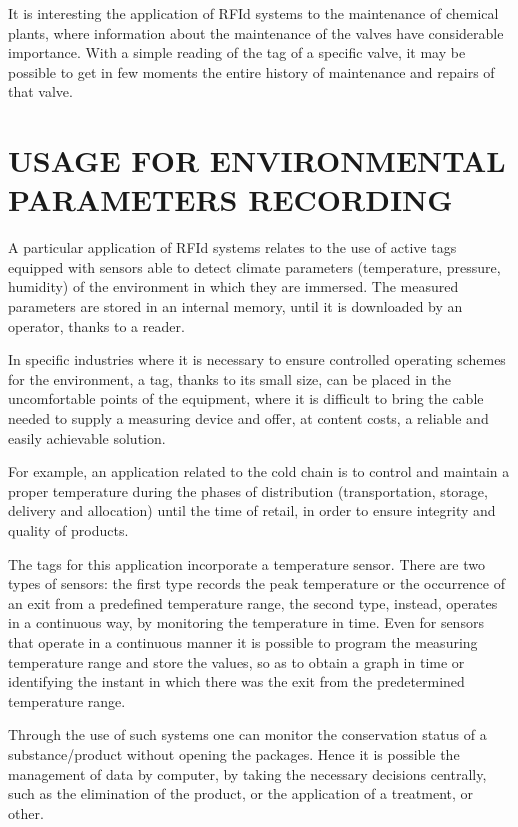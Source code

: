 \vspace*{1pc}
It is interesting the application of RFId systems to the maintenance of chemical plants, where information about the maintenance of the valves have considerable importance. With a simple reading of the tag of a specific valve, it may be possible to get in few moments the entire history of maintenance and repairs of that valve.
 
\section[USAGE FOR ENVIRONMENTAL PARAMETERS RECORDING]{\fontsize{14}{12}\selectfont USAGE FOR ENVIRONMENTAL PARAMETERS RECORDING} 
A particular application of RFId systems relates to the use of active tags equipped with sensors able to detect climate parameters (temperature, pressure, humidity) of the environment in which they are immersed. The measured parameters are stored in an internal memory, until it is downloaded by an operator, thanks to a reader. 

\vspace*{1pc}
In specific industries where it is necessary to ensure controlled operating schemes for the environment, a tag, thanks to its small size, can be placed in the uncomfortable points of the equipment, where it is difficult to bring the cable needed to supply a measuring device and offer, at content costs, a reliable and easily achievable solution. 

\vspace*{1pc}
For example, an application related to the cold chain is to control and maintain a proper temperature during the phases of distribution (transportation, storage, delivery and allocation) until the time of retail, in order to ensure integrity and quality of products. 

\vspace*{1pc}
The tags for this application incorporate a temperature sensor. There are two types of sensors: the first type records the peak temperature or the occurrence of an exit from a predefined temperature range, the second type, instead, operates in a continuous way, by monitoring the temperature in time. Even for sensors that operate in a continuous manner it is possible to program the measuring temperature range and store the values, so as to obtain a graph in time or identifying the instant in which there was the exit from the predetermined temperature range. 

\vspace*{1pc}
Through the use of such systems one can monitor the conservation status of a substance/product without opening the packages. Hence it is possible the management of data by computer, by taking the necessary decisions centrally, such as the elimination of the product, or the application of a treatment, or other. 

